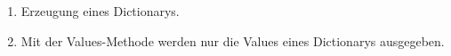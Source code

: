 \begin{enumerate}
\item Erzeugung eines Dictionarys. 


\item Mit der Values-Methode werden nur die Values eines Dictionarys ausgegeben. 

\end{enumerate}

